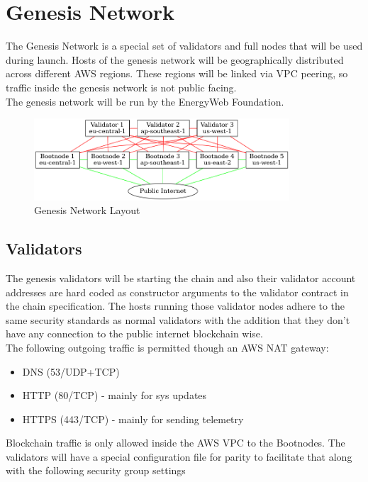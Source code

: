 \section{Genesis Network}

The Genesis Network is a special set of validators and full nodes that will be used during launch. Hosts of the genesis network will be geographically distributed across different AWS regions. These regions will be linked via VPC peering, so traffic inside the genesis network is not public facing. \\

The genesis network will be run by the EnergyWeb Foundation.

\begin{figure}[ht]
	\centering
    \includegraphics[width=0.85\textwidth,keepaspectratio]{./images/genesis-network.png}
	\caption{Genesis Network Layout}
	\label{fig:genesisnet}
\end{figure}

\subsection{Validators}

The genesis validators will be starting the chain and also their validator account addresses are hard coded as constructor arguments to the validator contract in the chain specification. The hosts running those validator nodes adhere to the same security standards as normal validators with the addition that they don't have any connection to the public internet blockchain wise. \\
The following outgoing traffic is permitted though an AWS NAT gateway:

\begin{itemize}
    \item DNS (53/UDP+TCP)
    \item HTTP (80/TCP) - mainly for sys updates
    \item HTTPS (443/TCP) - mainly for sending telemetry
\end{itemize}

Blockchain traffic is only allowed inside the AWS VPC to the Bootnodes. The validators will have a special configuration file for parity to facilitate that along with the following security group settings

